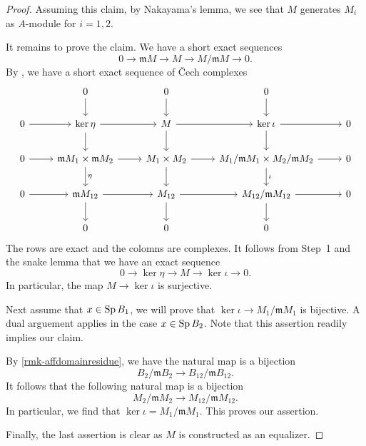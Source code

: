 \begin{proof}
    Assuming this claim, by Nakayama's lemma, we see that $M$ generates $M_i$ as $A$-module for $i=1,2$. 

    It remains to prove the claim. We have a short exact sequences
    \[
        0\rightarrow \mathfrak{m}M\rightarrow M\rightarrow M/\mathfrak{m}M\rightarrow 0.  
    \]
    By \cite[\href{https://stacks.math.columbia.edu/tag/03OM}{Tag 03OM}]{stacks-project}, we have a short exact sequence of \v{C}ech complexes
    \[
        \begin{tikzcd}
            & 0 \arrow[d]                                                       & 0 \arrow[d]                       & 0 \arrow[d]                                                                &   \\
0 \arrow[r] & \ker \eta \arrow[r] \arrow[d]                                     & M \arrow[r] \arrow[d]             & \ker \iota \arrow[r] \arrow[d]                                             & 0 \\
0 \arrow[r] & \mathfrak{m}M_1\times \mathfrak{m}M_2 \arrow[r] \arrow[d, "\eta"] & M_1\times M_2 \arrow[r] \arrow[d] & M_1/\mathfrak{m}M_1\times M_2/\mathfrak{m}M_2 \arrow[r] \arrow[d, "\iota"] & 0 \\
0 \arrow[r] & \mathfrak{m}M_{12} \arrow[r] \arrow[d]                            & M_{12} \arrow[r] \arrow[d]        & M_{12}/\mathfrak{m}M_{12} \arrow[r] \arrow[d]                              & 0 \\
            & 0                                                                 & 0                                 & 0                                                                          &  
\end{tikzcd}
    \]
    The rows are exact and the colomns are complexes. It follows from Step~1 and the snake lemma that we have an exact sequence
    \[
        0\rightarrow \ker \eta\rightarrow M\rightarrow \ker \iota\rightarrow 0.  
    \]
    In particular, the map $M\rightarrow \ker \iota$ is surjective. 
    
    
    Next assume that $x\in \operatorname{Sp} B_1$, we will prove that $\ker \iota\rightarrow M_1/\mathfrak{m} M_1$ is bijective. A dual arguement applies in the case $x\in \operatorname{Sp} B_2$.  Note that this assertion readily implies our claim.

    By \cref{rmk-affdomainresidue}, we have the natural map is a bijection
    \[
        B_2/\mathfrak{m}B_2\rightarrow B_{12}/\mathfrak{m}B_{12}. 
    \]
    It follows that the following natural map is a bijection
    \[
        M_2/\mathfrak{m}M_2\rightarrow M_{12}/\mathfrak{m}M_{12}.  
    \]
    In particular, we find that $\ker \iota=M_1/\mathfrak{m}M_1$. This proves our assertion.

    Finally, the last assertion is clear as $M$ is constructed as an equalizer.
\end{proof}

